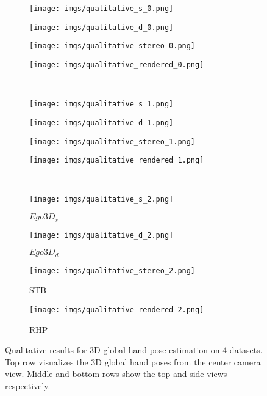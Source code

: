 \documentclass[10pt,twocolumn,letterpaper]{article}
\begin{document}
\begin{figure*}[t]
  \begin{subfigure}[t]{0.29283019\linewidth}
    \texttt{[image: imgs/qualitative\_s\_0.png]}
  \end{subfigure}
  \begin{subfigure}[t]{0.29283019\linewidth}
    \texttt{[image: imgs/qualitative\_d\_0.png]}
  \end{subfigure}
  \begin{subfigure}[t]{0.21962264\linewidth}
    \texttt{[image: imgs/qualitative\_stereo\_0.png]}
  \end{subfigure}
  \begin{subfigure}[t]{0.16471698\linewidth}
    \texttt{[image: imgs/qualitative\_rendered\_0.png]}
  \end{subfigure}\\
  \begin{subfigure}[t]{0.29283019\linewidth}
    \texttt{[image: imgs/qualitative\_s\_1.png]}
  \end{subfigure}
  \begin{subfigure}[t]{0.29283019\linewidth}
    \texttt{[image: imgs/qualitative\_d\_1.png]}
  \end{subfigure}
  \begin{subfigure}[t]{0.21962264\linewidth}
    \texttt{[image: imgs/qualitative\_stereo\_1.png]}
  \end{subfigure}
  \begin{subfigure}[t]{0.16471698\linewidth}
    \texttt{[image: imgs/qualitative\_rendered\_1.png]}
  \end{subfigure}\\
  \begin{subfigure}[t]{0.29283019\linewidth}
    \texttt{[image: imgs/qualitative\_s\_2.png]}
    \caption{$Ego3D_{s}$}\label{fig:qualitative_ego_s}
  \end{subfigure}
  \begin{subfigure}[t]{0.29283019\linewidth}
    \texttt{[image: imgs/qualitative\_d\_2.png]}
    \caption{$Ego3D_{d}$}\label{fig:qualitative_ego_d}
  \end{subfigure}
  \begin{subfigure}[t]{0.21962264\linewidth}
    \texttt{[image: imgs/qualitative\_stereo\_2.png]}
    \caption{STB}\label{fig:qualitative_stb}
  \end{subfigure}
  \begin{subfigure}[t]{0.16471698\linewidth}
    \texttt{[image: imgs/qualitative\_rendered\_2.png]}
    \caption{RHP}\label{fig:qualitative_rhp}
  \end{subfigure}
  \vspace{0.2cm}
  \caption{Qualitative results for 3D global hand pose estimation on 4 datasets. Top row visualizes the 3D global hand poses from the center camera view. Middle and bottom rows show the top and side views respectively.}
  \label{fig:qualitative_results}
\end{figure*}
\end{document}
